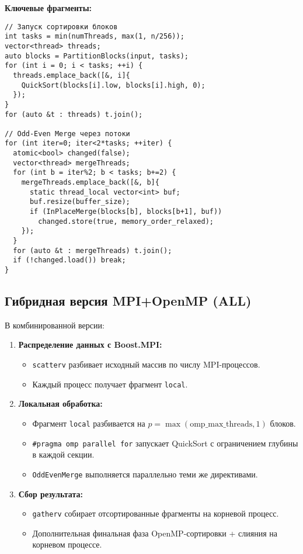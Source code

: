 \documentclass[12pt]{article}
\begin{document}
\noindent\textbf{Ключевые фрагменты:}
\lstset{language=C++}
\begin{lstlisting}
// Запуск сортировки блоков
int tasks = min(numThreads, max(1, n/256));
vector<thread> threads;
auto blocks = PartitionBlocks(input, tasks);
for (int i = 0; i < tasks; ++i) {
  threads.emplace_back([&, i]{
    QuickSort(blocks[i].low, blocks[i].high, 0);
  });
}
for (auto &t : threads) t.join();

// Odd-Even Merge через потоки
for (int iter=0; iter<2*tasks; ++iter) {
  atomic<bool> changed(false);
  vector<thread> mergeThreads;
  for (int b = iter%2; b < tasks; b+=2) {
    mergeThreads.emplace_back([&, b]{
      static thread_local vector<int> buf;
      buf.resize(buffer_size);
      if (InPlaceMerge(blocks[b], blocks[b+1], buf))
        changed.store(true, memory_order_relaxed);
    });
  }
  for (auto &t : mergeThreads) t.join();
  if (!changed.load()) break;
}
\end{lstlisting}

\subsection{Гибридная версия MPI+OpenMP (ALL)}
\hspace*{1.25em}В комбинированной версии:
\begin{enumerate}
    \item \textbf{Распределение данных с Boost.MPI:}
    \begin{itemize}
        \item \texttt{scatterv} разбивает исходный массив по числу MPI-процессов.
        \item Каждый процесс получает фрагмент \texttt{local}.
    \end{itemize}
    \item \textbf{Локальная обработка:}
    \begin{itemize}
        \item Фрагмент \texttt{local} разбивается на $p = \max(\text{omp\_max\_threads}, 1)$ блоков.
        \item \texttt{\#pragma omp parallel for} запускает QuickSort с ограничением глубины в каждой секции.
        \item \texttt{OddEvenMerge} выполняется параллельно теми же директивами.
    \end{itemize}
    \item \textbf{Сбор результата:}
    \begin{itemize}
        \item \texttt{gatherv} собирает отсортированные фрагменты на корневой процесс.
        \item Дополнительная финальная фаза OpenMP-сортировки + слияния на корневом процессе.
    \end{itemize}
\end{enumerate}
\end{document}

